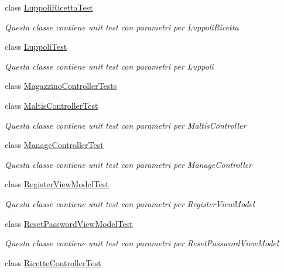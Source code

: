 \begin{DoxyCompactItemize}
class \mbox{\hyperlink{class_brew_day2_1_1_tests_1_1_luppoli_ricetta_test}{Luppoli\+Ricetta\+Test}}
\begin{DoxyCompactList}\small\item\em Questa classe contiene unit test con parametri per Luppoli\+Ricetta\end{DoxyCompactList}\item 
class \mbox{\hyperlink{class_brew_day2_1_1_tests_1_1_luppoli_test}{Luppoli\+Test}}
\begin{DoxyCompactList}\small\item\em Questa classe contiene unit test con parametri per Luppoli\end{DoxyCompactList}\item 
class \mbox{\hyperlink{class_brew_day2_1_1_tests_1_1_magazzino_controller_tests}{Magazzino\+Controller\+Tests}}
\item 
class \mbox{\hyperlink{class_brew_day2_1_1_tests_1_1_maltis_controller_test}{Maltis\+Controller\+Test}}
\begin{DoxyCompactList}\small\item\em Questa classe contiene unit test con parametri per Maltis\+Controller\end{DoxyCompactList}\item 
class \mbox{\hyperlink{class_brew_day2_1_1_tests_1_1_manage_controller_test}{Manage\+Controller\+Test}}
\begin{DoxyCompactList}\small\item\em Questa classe contiene unit test con parametri per Manage\+Controller\end{DoxyCompactList}\item 
class \mbox{\hyperlink{class_brew_day2_1_1_tests_1_1_register_view_model_test}{Register\+View\+Model\+Test}}
\begin{DoxyCompactList}\small\item\em Questa classe contiene unit test con parametri per Register\+View\+Model\end{DoxyCompactList}\item 
class \mbox{\hyperlink{class_brew_day2_1_1_tests_1_1_reset_password_view_model_test}{Reset\+Password\+View\+Model\+Test}}
\begin{DoxyCompactList}\small\item\em Questa classe contiene unit test con parametri per Reset\+Password\+View\+Model\end{DoxyCompactList}\item 
class \mbox{\hyperlink{class_brew_day2_1_1_tests_1_1_ricette_controller_test}{Ricette\+Controller\+Test}}

\end{DoxyCompactItemize}
